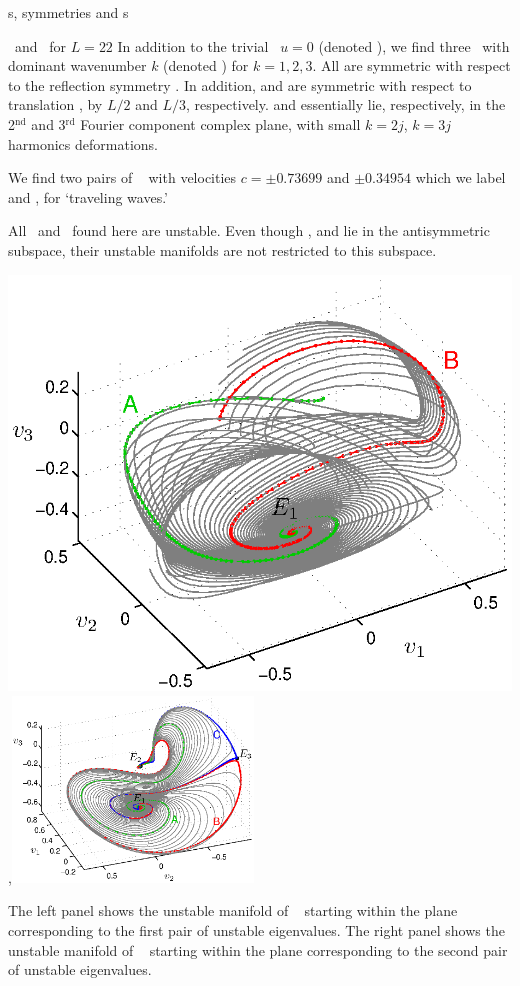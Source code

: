 \documentclass{theo1poster}[2003/04/25]
\begin{document}
\begin{poster}{3}
\begin{sheet}{\Rpo s, symmetries and \po s}
\end{sheet}


\begin{sheet}{\Eqva\ and \reqva\ for $L=22$}
In addition to the trivial \eqv\ $u=0$ (denoted ),
we find three \eqva\ with dominant wavenumber $k$
(denoted ) for $k = 1, 2, 3$.  All {\eqva}  are symmetric with respect to the reflection
symmetry .
In addition,  and  are symmetric with respect
to translation , by $L/2$ and $L/3$, respectively.
 and  essentially lie, respectively, in
the 2$^\mathrm{nd}$ and 3$^\mathrm{rd}$ Fourier component complex plane,
with small $k=2j$, $k=3j$ harmonics deformations.

We find two pairs of \reqva\  with velocities
$c =\pm 0.73699$ and $\pm 0.34954$
which we label  and ,
for `traveling waves.' 

All \eqva\ and \reqva\ found here are unstable. Even though ,  and  lie in
the antisymmetric subspace, their unstable manifolds are not restricted to this subspace.

\centerline{\includegraphics[width=.48\textwidth]{../../figs/ks22_E1_plane1_manifold_c.eps},\includegraphics[width=0.48\textwidth]{../../figs/ks22_E1_plane2_manifold_c.eps}}
The left panel shows the unstable
manifold of \eqv\  starting within the plane
corresponding to the first pair of unstable eigenvalues. 
The right panel shows the unstable
manifold of \eqv\  starting within the plane
corresponding to the second pair of unstable eigenvalues. 


\end{sheet}
\end{poster}
\end{document}
